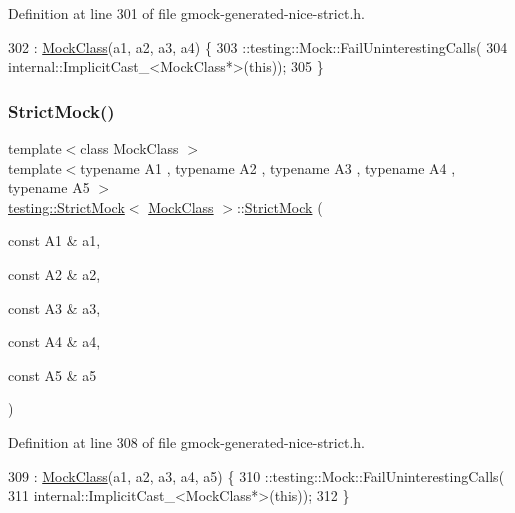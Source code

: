 Definition at line 301 of file gmock-\/generated-\/nice-\/strict.\+h.


\begin{DoxyCode}
302                     : \hyperlink{classMockClass}{MockClass}(a1, a2, a3, a4) \{
303     ::testing::Mock::FailUninterestingCalls(
304         internal::ImplicitCast\_<MockClass*>(\textcolor{keyword}{this}));
305   \}
\end{DoxyCode}
\mbox{\label{classtesting_1_1StrictMock_a2019f4e86224b2adbb9e9326bc175c50}} 
\subsubsection{\texorpdfstring{Strict\+Mock()}{StrictMock()}\hspace{0.1cm}{\footnotesize\ttfamily [6/11]}}
{\footnotesize\ttfamily template$<$class Mock\+Class $>$ \\
template$<$typename A1 , typename A2 , typename A3 , typename A4 , typename A5 $>$ \\
\hyperlink{classtesting_1_1StrictMock}{testing\+::\+Strict\+Mock}$<$ \hyperlink{classMockClass}{Mock\+Class} $>$\+::\hyperlink{classtesting_1_1StrictMock}{Strict\+Mock} (\begin{DoxyParamCaption}\item[{const A1 \&}]{a1,  }\item[{const A2 \&}]{a2,  }\item[{const A3 \&}]{a3,  }\item[{const A4 \&}]{a4,  }\item[{const A5 \&}]{a5 }\end{DoxyParamCaption})\hspace{0.3cm}{\ttfamily [inline]}}



Definition at line 308 of file gmock-\/generated-\/nice-\/strict.\+h.


\begin{DoxyCode}
309                     : \hyperlink{classMockClass}{MockClass}(a1, a2, a3, a4, a5) \{
310     ::testing::Mock::FailUninterestingCalls(
311         internal::ImplicitCast\_<MockClass*>(\textcolor{keyword}{this}));
312   \}
\end{DoxyCode}
\mbox{\label{classtesting_1_1StrictMock_a17b452e1e2f57d7d10f7209587376eef}} 
